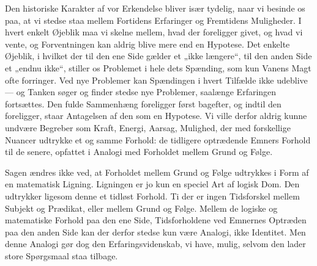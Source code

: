 \documentclass[12pt,a4paper]{book}
\newcommand{\apage}[1]{\marginnote{\footnotesize\textit{[#1]}}}
\begin{document}
\apage{285} Den historiske Karakter af vor Erkendelse bliver især tydelig, naar vi besinde os
paa, at vi stedse staa mellem Fortidens Erfaringer og Fremtidens Muligheder. I hvert
enkelt Øjeblik maa vi skelne mellem, hvad der foreligger givet, og hvad vi vente, og
Forventningen kan aldrig blive mere end en Hypotese. Det enkelte Øjeblik, i hvilket
der til den ene Side gælder et „ikke længere“, til den anden Side et „endnu ikke“,
stiller os Problemet i hele dets Spænding, som kun Vanens Magt ofte forringer. Ved
nye Problemer kan Spændingen i hvert Tilfælde ikke udeblive --- og Tanken søger og
finder stedse nye Problemer, saalænge Erfaringen fortsættes. Den fulde Sammenhæng
foreligger først bagefter, og indtil den foreligger, staar Antagelsen af den som en
Hypotese. Vi ville derfor aldrig kunne undvære Begreber som Kraft, Energi, Aarsag,
Mulighed, der med forskellige Nuancer udtrykke et og samme Forhold: de tidligere
optrædende Emners Forhold til de senere, opfattet i Analogi med Forholdet mellem
Grund og Følge.

Sagen ændres ikke ved, at Forholdet mellem Grund og Følge udtrykkes i Form af en
matematisk Ligning. Ligningen er jo kun en speciel Art af logisk Dom. Den udtrykker
ligesom denne et tidløst Forhold. Ti der er ingen Tidsforskel mellem Subjekt og
Prædikat, eller mellem Grund og Følge. Mellem de logiske og matematiske Forhold paa
den ene Side, Tidsforholdene ved Emnernes Optræden paa den anden Side kan der derfor
stedse kun være Analogi, ikke Identitet. Men denne Analogi gør dog den
Erfaringsvidenskab, vi have, mulig, selvom den lader store Spørgsmaal staa tilbage.
\end{document}
